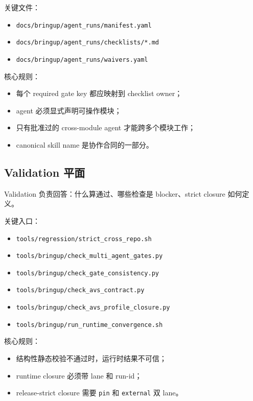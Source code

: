\documentclass[UTF8,11pt,a4paper]{ctexart}
\begin{document}
关键文件：

\begin{itemize}
  \item \texttt{docs/bringup/agent\_runs/manifest.yaml}
  \item \texttt{docs/bringup/agent\_runs/checklists/*.md}
  \item \texttt{docs/bringup/agent\_runs/waivers.yaml}
\end{itemize}

核心规则：

\begin{itemize}
  \item 每个 required gate key 都应映射到 checklist owner；
  \item agent 必须显式声明可操作模块；
  \item 只有批准过的 cross-module agent 才能跨多个模块工作；
  \item canonical skill name 是协作合同的一部分。
\end{itemize}

\subsection{Validation 平面}

Validation 负责回答：什么算通过、哪些检查是 blocker、strict closure 如何定义。

关键入口：

\begin{itemize}
  \item \texttt{tools/regression/strict\_cross\_repo.sh}
  \item \texttt{tools/bringup/check\_multi\_agent\_gates.py}
  \item \texttt{tools/bringup/check\_gate\_consistency.py}
  \item \texttt{tools/bringup/check\_avs\_contract.py}
  \item \texttt{tools/bringup/check\_avs\_profile\_closure.py}
  \item \texttt{tools/bringup/run\_runtime\_convergence.sh}
\end{itemize}

核心规则：

\begin{itemize}
  \item 结构性静态校验不通过时，运行时结果不可信；
  \item runtime closure 必须带 lane 和 run-id；
  \item release-strict closure 需要 \texttt{pin} 和 \texttt{external} 双 lane。
\end{itemize}
\end{document}
